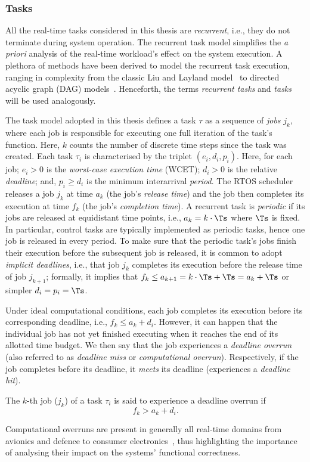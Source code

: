 \subsubsection*{Tasks}%
All the real-time tasks considered in this thesis are \emph{recurrent}, i.e., they do not terminate during system operation.
The recurrent task model simplifies the \emph{a priori} analysis of the real-time workload's effect on the system execution.
A plethora of methods have been derived to model the recurrent task execution, ranging in complexity from the classic Liu and Layland model~\cite{Liu:1973} to directed acyclic graph (DAG) models~\cite{Saifullah:2014}.
Henceforth, the terms \emph{recurrent tasks} and \emph{tasks} will be used analogously.

The task model adopted in this thesis defines a task $\tau$ as a sequence of \emph{jobs} $j_k$, where each job is responsible for executing one full iteration of the task's function.
Here, $k$ counts the number of discrete time steps since the task was created.
Each task $\tau_i$ is characterised by the triplet $(e_i, d_i, p_i)$.
Here, for each job; $e_i > 0$ is the \emph{worst-case execution time} (WCET); $d_i > 0$ is the relative \emph{deadline}; and, $p_i \geq d_i$ is the minimum interarrival \emph{period}.
The RTOS scheduler releases a job $j_k$ at time $a_k$ (the job's \emph{release time}) and the job then completes its execution at time $f_k$ (the job's \emph{completion time}).
A recurrent task is \emph{periodic} if its jobs are released at equidistant time points, i.e., $a_k = k\cdot \Ts$ where $\Ts$ is fixed. 
In particular, control tasks are typically implemented as periodic tasks, hence one job is released in every period.
To make sure that the periodic task's jobs finish their execution before the subsequent job is released, it is common to adopt \emph{implicit deadlines}, i.e., that job $j_k$ completes its execution before the release time of job $j_{k+1}$; formally, it implies that $f_k \leq a_{k+1} = k\cdot \Ts+\Ts = a_k + \Ts$ or simpler $d_i = p_i = \Ts$.

Under ideal computational conditions, each job completes its execution before its corresponding deadline, i.e., $f_k \leq a_k + d_i$.
However, it can happen that the individual job has not yet finished executing when it reaches the end of its allotted time budget.
We then say that the job experiences a \emph{deadline overrun} (also referred to as \emph{deadline miss} or \emph{computational overrun}).
Respectively, if the job completes before its deadline, it \emph{meets} its deadline (experiences a \emph{deadline hit}).
%
\begin{definition}%
    \label{def:kappa:overrun}%
    The $k$-th job ($j_k$) of a task $\tau_i$ is said to experience a deadline overrun if
    \begin{equation}
        f_k > a_k + d_i.
    \end{equation}
\end{definition}
%
Computational overruns are present in generally all real-time domains from avionics and defence to consumer electronics~\cite{Akesson:2020}, thus highlighting the importance of analysing their impact on the systems' functional correctness.

